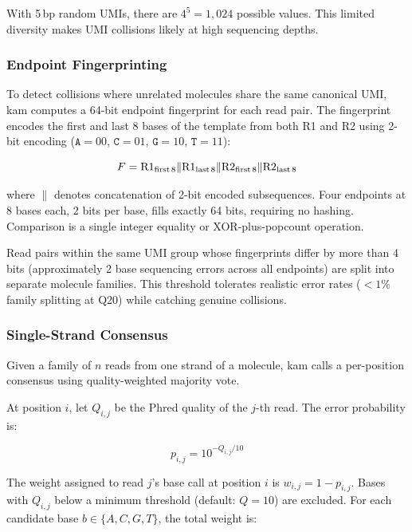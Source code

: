 With 5\,bp random UMIs, there are $4^5 = 1{,}024$ possible values.
This limited diversity makes UMI collisions likely at high sequencing depths.

\subsubsection{Endpoint Fingerprinting}

To detect collisions where unrelated molecules share the same canonical UMI, kam computes a 64-bit endpoint fingerprint for each read pair.
The fingerprint encodes the first and last 8 bases of the template from both R1 and R2 using 2-bit encoding ($\texttt{A}=00$, $\texttt{C}=01$, $\texttt{G}=10$, $\texttt{T}=11$):

\begin{equation}
  \label{eq:fingerprint}
  F = \text{R1}_\text{first\,8} \| \text{R1}_\text{last\,8} \| \text{R2}_\text{first\,8} \| \text{R2}_\text{last\,8}
\end{equation}

\noindent where $\|$ denotes concatenation of 2-bit encoded subsequences.
Four endpoints at 8 bases each, 2 bits per base, fills exactly 64 bits, requiring no hashing.
Comparison is a single integer equality or XOR-plus-popcount operation.

Read pairs within the same UMI group whose fingerprints differ by more than 4 bits (approximately 2 base sequencing errors across all endpoints) are split into separate molecule families.
This threshold tolerates realistic error rates ($< 1\%$ family splitting at Q20) while catching genuine collisions.

\subsubsection{Single-Strand Consensus}
\label{sec:method:ssc}

Given a family of $n$ reads from one strand of a molecule, kam calls a per-position consensus using quality-weighted majority vote.

At position $i$, let $Q_{i,j}$ be the Phred quality of the $j$-th read.
The error probability is:

\begin{equation}
  \label{eq:phred-to-prob}
  p_{i,j} = 10^{-Q_{i,j}/10}
\end{equation}

The weight assigned to read $j$'s base call at position $i$ is $w_{i,j} = 1 - p_{i,j}$.
Bases with $Q_{i,j}$ below a minimum threshold (default: $Q = 10$) are excluded.
For each candidate base $b \in \{A, C, G, T\}$, the total weight is:

